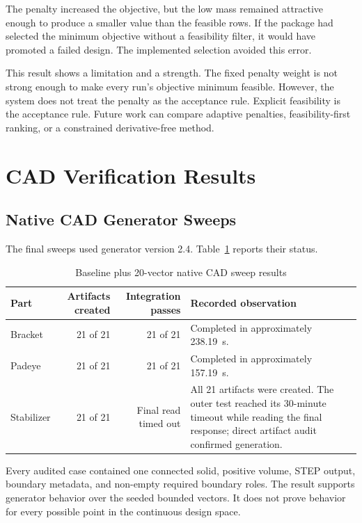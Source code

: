 The penalty increased the objective, but the low mass remained attractive
enough to produce a smaller value than the feasible rows. If the package had
selected the minimum objective without a feasibility filter, it would have
promoted a failed design. The implemented selection avoided this error.

This result shows a limitation and a strength. The fixed penalty weight is not
strong enough to make every run's objective minimum feasible. However, the
system does not treat the penalty as the acceptance rule. Explicit feasibility
is the acceptance rule. Future work can compare adaptive penalties,
feasibility-first ranking, or a constrained derivative-free method.

\section{CAD Verification Results}
\label{sec:cad-results}

\subsection{Native CAD Generator Sweeps}
\label{sec:cad-sweep-results}

The final sweeps used generator version 2.4. Table~\ref{tab:cad-sweep-results}
reports their status.

\begin{table}[H]
\centering
\caption{Baseline plus 20-vector native CAD sweep results}
\label{tab:cad-sweep-results}
\begin{tabularx}{\textwidth}{
    >{\raggedright\arraybackslash}X
    rr
    >{\raggedright\arraybackslash}X}
\toprule
\textbf{Part} & \textbf{Artifacts created} & \textbf{Integration passes} &
\textbf{Recorded observation}\\
\midrule
Bracket & 21 of 21 & 21 of 21 &
Completed in approximately 238.19~s.\\
Padeye & 21 of 21 & 21 of 21 &
Completed in approximately 157.19~s.\\
Stabilizer & 21 of 21 & Final read timed out &
All 21 artifacts were created. The outer test reached its 30-minute timeout
while reading the final response; direct artifact audit confirmed generation.\\
\bottomrule
\end{tabularx}
\end{table}

Every audited case contained one connected solid, positive volume, STEP
output, boundary metadata, and non-empty required boundary roles. The result
supports generator behavior over the seeded bounded vectors. It does not prove
behavior for every possible point in the continuous design space.

